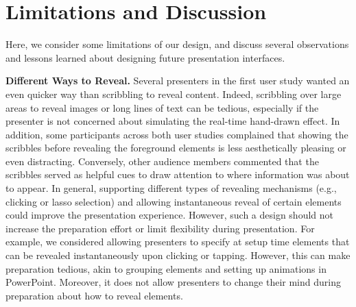 \section{Limitations and Discussion}
Here, we consider some limitations of our design, and discuss several observations and lessons learned about designing future presentation interfaces.

\textbf{Different Ways to Reveal.}  Several presenters in the first user study wanted an even quicker way than scribbling to reveal content. Indeed, scribbling over large areas to reveal images or long lines of text can be tedious, especially if the presenter is not concerned about simulating the real-time hand-drawn effect. 
%
In addition, some participants across both user studies complained that showing the scribbles before revealing the foreground elements is less aesthetically pleasing or even distracting. Conversely, other audience members commented that the scribbles served as helpful cues to draw attention to where information was about to appear. %
%
In general, supporting different types of revealing mechanisms (e.g., clicking or lasso selection) and allowing instantaneous reveal of certain elements could improve the presentation experience. However, such a design should not increase the preparation effort or limit flexibility during presentation.
%
For example, we considered allowing presenters to specify at setup time elements that can be revealed instantaneously upon clicking or tapping. However, this can make preparation tedious, akin to grouping elements and setting up animations in PowerPoint. Moreover, it does not allow presenters to change their mind during preparation about how to reveal elements. 

